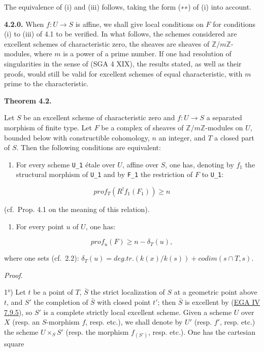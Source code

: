 \documentclass[
  11pt,
  a4paper,
]{book}
\providecommand{\tightlist}{%
  \setlength{\itemsep}{0pt}\setlength{\parskip}{0pt}}
\begin{document}
The equivalence of (i) and (iii) follows, taking the form (∗∗) of (i)
into account.

\textbf{4.2.0.} When \(f : U \to S\) is affine, we shall give local
conditions on \(F\) for conditions (i) to (iii) of 4.1 to be verified.
In what follows, the schemes considered are excellent schemes of
characteristic zero, the sheaves are sheaves of
\(\mathbb{Z}/m\mathbb{Z}\)-modules, where \(m\) is a power of a prime
number. If one had resolution of singularities in the sense of (SGA 4
XIX), the results stated, as well as their proofs, would still be valid
for excellent schemes of equal characteristic, with \(m\) prime to the
characteristic.

\textbf{Theorem 4.2.}

Let \(S\) be an excellent scheme of characteristic zero and
\(f : U \to S\) a separated morphism of finite type. Let \(F\) be a
complex of sheaves of \(\mathbb{Z}/m\mathbb{Z}\)-modules on \(U\),
bounded below with constructible cohomology, \(n\) an integer, and \(T\)
a closed part of \(S\). Then the following conditions are equivalent:

\begin{enumerate}
\def\labelenumi{(\roman{enumi})}
\tightlist
\item
  For every scheme \texttt{U\_1} étale over \(U\), affine over \(S\),
  one has, denoting by \(f_{1}\) the structural morphism of
  \texttt{U\_1} and by \texttt{F\_1} the restriction of \(F\) to
  \texttt{U\_1}:
\end{enumerate}

\[ prof_{T}(R^{!} f_{1}(F_{1})) \geqslant n \]

(cf.~Prop. 4.1 on the meaning of this relation).

\begin{enumerate}
\def\labelenumi{(\roman{enumi})}
\setcounter{enumi}{1}
\tightlist
\item
  For every point \(u\) of \(U\), one has:
\end{enumerate}

\[ prof_{u}(F) \geqslant n - \delta_{T}(u), \]

where one sets (cf.~2.2):
\(\delta_{T}(u) = deg.tr.(k(x)/k(s)) + codim({s} \cap T, {s})\).

\emph{Proof.}

1°) Let \(t\) be a point of \(T\), \(\bar{S}\) the strict localization
of \(S\) at a geometric point above \(t\), and \(S'\) the completion of
\(\bar{S}\) with closed point \(t'\); then \(\bar{S}\) is excellent by
(\href{https://jcreinhold.github.io/ega/iv/19-ch4-07-noetherian-completion.html\#79-excellent-rings-and-resolution-of-singularities}{EGA
IV 7.9.5}), so \(S'\) is a complete strictly local excellent scheme.
Given a scheme \(U\) over \(X\) (resp. an \(S\)-morphism \(f\), resp.
etc.), we shall denote by \(U'\) (resp. \(f'\), resp. etc.) the scheme
\(U \times_{S} S'\) (resp. the morphism \(f_{(S')}\), resp. etc.). One
has the cartesian square
\end{document}
